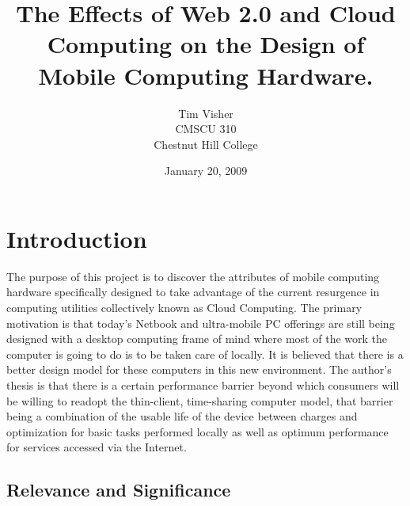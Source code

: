 \documentclass[12pt,oneside,letterpaper,titlepage]{article}
\author{Tim Visher\\ CMSCU 310\\ Chestnut Hill College}
\title{The Effects of Web 2.0 and Cloud Computing on the Design of Mobile Computing Hardware.}
\date{January 20, 2009}
\begin{document}
\maketitle

\tableofcontents

\section{Introduction}

The purpose of this project is to discover the attributes of mobile computing
hardware specifically designed to take advantage of the current resurgence in
computing utilities collectively known as Cloud Computing.  The primary
motivation is that today's Netbook and ultra-mobile PC offerings are still being
designed with a desktop computing frame of mind where most of the work the
computer is going to do is to be taken care of locally.  It is believed that
there is a better design model for these computers in this new environment.  The
author's thesis is that there is a certain performance barrier beyond which
consumers will be willing to readopt the thin-client, time-sharing computer
model, that barrier being a combination of the usable life of the device between
charges and optimization for basic tasks performed locally as well as optimum
performance for services accessed via the Internet.

\subsection{Relevance and Significance}
\end{document}
